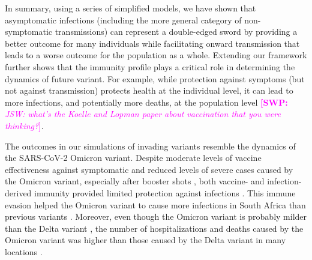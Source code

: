 \documentclass[12pt]{article}
\newcommand{\comment}{\showcomment}
\newcommand{\showcomment}[3]{\textcolor{#1}{\textbf{[#2: }\textsl{#3}\textbf{]}}}
\newcommand{\swp}[1]{\comment{magenta}{SWP}{#1}}
\begin{document}
In summary, using a series of simplified models, we have shown that asymptomatic infections (including the more general category of non-symptomatic transmissions) can represent a double-edged sword by providing a better outcome for many individuals while facilitating onward transmission that leads to a worse outcome for the population as a whole.
Extending our framework further shows that the immunity profile plays a critical role in determining the dynamics of future variant. 
For example, while protection against symptoms (but not against transmission) protects health at the individual level, it can lead to more infections, and potentially more deaths, at the population level \swp{JSW: what's the Koelle and Lopman paper about vaccination that you were thinking?}.

The outcomes in our simulations of invading variants resemble the dynamics of the SARS-CoV-2 Omicron variant.
Despite moderate levels of vaccine effectiveness against symptomatic and reduced levels of severe cases caused by the Omicron variant, especially after booster shots \citep{andres2022omicron}, both vaccine- and infection-derived immunity provided limited protection against infections \citep{pearson2021omicron}.
This immune evasion helped the Omicron variant to cause more infections in South Africa than previous variants \citep{sun2022omicron}.
Moreover, even though the Omicron variant is probably milder than the Delta variant \citep{MENNI20221618,ulloa2022estimates}, the number of hospitalizations and deaths caused by the Omicron variant was higher than those caused by the Delta variant in many locations \citep{Iacobuccio254,faust2022omicron,sigal2022estimating}.
\end{document}

